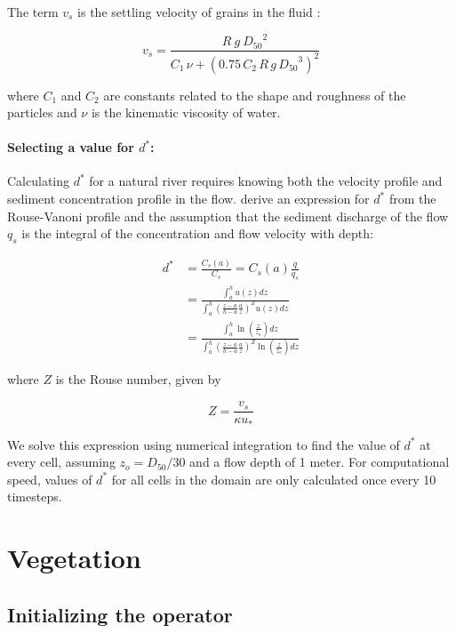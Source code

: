 \documentclass[10pt]{article}
\begin{document}
The term $v_s$ is the settling velocity of grains in the fluid \citep{ferguson2004simple}:

\begin{equation}
v_s = \frac{R \: g \: {D_{50}}^2}{C_1 \, \nu + (0.75 \, C_2 \, R \, g \, {D_{50}}^3)^2}
\end{equation}

\noindent where $C_1$ and $C_2$ are constants related to the shape and roughness of the particles and $\nu$ is the kinematic viscosity of water. 

\paragraph{Selecting a value for $d^*$:}

Calculating $d^*$ for a natural river requires knowing both the velocity profile and sediment concentration profile in the flow. \citet{davy2009fluvial} derive an expression for $d^*$ from the Rouse-Vanoni profile and the assumption that the sediment discharge of the flow $q_s$ is the integral of the concentration and flow velocity with depth:

\begin{equation}
\begin{split}
d^* & = \frac{C_s(a)}{C_s} = C_s(a) \frac{q}{q_s} \\
& = \frac{\int_{a}^{h} u(z) dz}{\int_{a}^{h} (\frac{z-a}{h-a}\frac{a}{z})^Z u(z) dz} \\
& = \frac{\int_{a}^{h} \ln{(\frac{z}{z_o})} dz}{\int_{a}^{h} (\frac{z-a}{h-a}\frac{a}{z})^Z \ln{(\frac{z}{z_o})} dz}
\end{split}
\end{equation} 

\noindent where $Z$ is the Rouse number, given by

\begin{equation}
Z = \frac{v_s}{\kappa u_*}
\end{equation}

We solve this expression using numerical integration to find the value of $d^*$ at every cell, assuming $z_o = D_{50}/30$ and a flow depth of 1 meter. For computational speed, values of $d^*$ for all cells in the domain are only calculated once every 10 timesteps.

\section{Vegetation}

\subsection{Initializing the operator}
\end{document}
